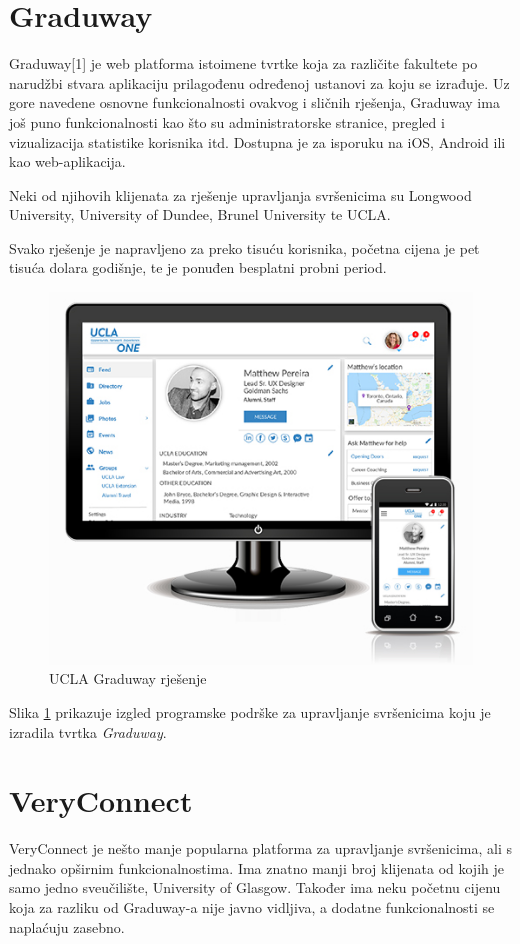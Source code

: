 \documentclass[zavrsni, numeric]{fer}
\begin{document}
\section{Graduway}
Graduway[1] je web platforma istoimene tvrtke koja za različite fakultete po narudžbi stvara aplikaciju prilagođenu određenoj ustanovi za koju se izrađuje. Uz gore navedene osnovne funkcionalnosti ovakvog i sličnih rješenja, Graduway ima još puno funkcionalnosti kao što su administratorske stranice, pregled  i vizualizacija statistike korisnika itd. Dostupna je za isporuku na iOS, Android ili kao web-aplikacija.

Neki od njihovih klijenata za rješenje upravljanja svršenicima su Longwood University, University of Dundee, Brunel University te UCLA.

Svako rješenje je napravljeno za preko tisuću korisnika, početna cijena je pet tisuća dolara godišnje, te je ponuđen besplatni probni period.

\begin{figure}[H]
	\centering
	\includegraphics[width=13cm]{slike/izgledUCLAgraduwayRjesenja.png}
	\caption{UCLA Graduway rješenje}
	\label{fig:ucla-graduway}
\end{figure}

Slika \ref{fig:ucla-graduway} prikazuje izgled programske podrške za upravljanje svršenicima koju je izradila tvrtka \textit{Graduway}.

\section{VeryConnect}
VeryConnect je nešto manje popularna platforma za upravljanje svršenicima, ali s jednako opširnim funkcionalnostima. Ima znatno manji broj klijenata od kojih je samo jedno sveučilište, University of Glasgow. Također ima neku početnu cijenu koja za razliku od Graduway-a nije javno vidljiva, a dodatne funkcionalnosti se naplaćuju zasebno.
\end{document}
